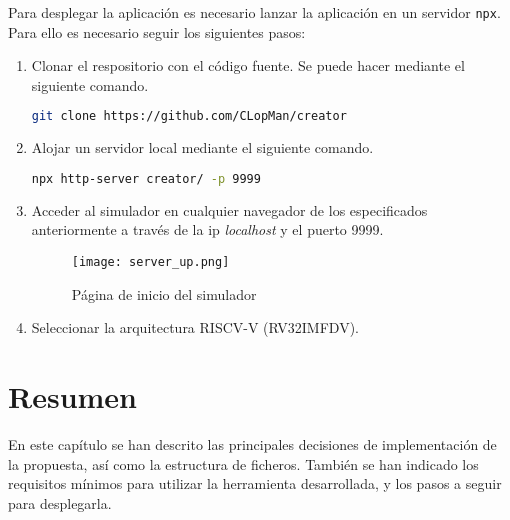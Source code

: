 Para desplegar la aplicación es necesario lanzar la aplicación en un servidor \texttt{npx}. Para ello es necesario seguir los siguientes pasos:
\begin{enumerate}
    \item Clonar el respositorio con el código fuente. Se puede hacer mediante el siguiente comando.
\begin{lstlisting}[language=bash, basicstyle=\scriptsize]
git clone https://github.com/CLopMan/creator
\end{lstlisting}
    \item Alojar un servidor local mediante el siguiente comando.
\begin{lstlisting}[language=bash, basicstyle=\scriptsize]
npx http-server creator/ -p 9999
\end{lstlisting}
    \item Acceder al simulador en cualquier navegador de los especificados anteriormente a través de la ip \textit{localhost} y el puerto 9999.
        \begin{figure}[H]
                \texttt{[image: server\_up.png]}
                \caption{Página de inicio del simulador}\label{fig:inicio-simulador}
        \end{figure}
    \item Seleccionar la arquitectura RISCV-V (RV32IMFDV).
\end{enumerate}

\section{Resumen}

En este capítulo se han descrito las principales decisiones de implementación de la propuesta, así como la estructura de ficheros. También se han indicado los requisitos mínimos para utilizar la herramienta desarrollada, y los pasos a seguir para desplegarla.
